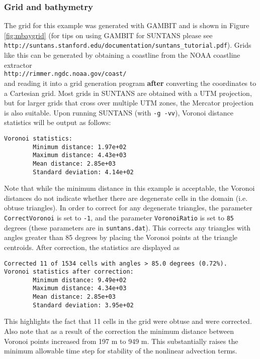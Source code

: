 \subsubsection{Grid and bathymetry}

The grid for this example was generated with GAMBIT and is shown in Figure \ref{fig:mbaygrid}
(for tips on using GAMBIT for SUNTANS please see\\
\verb+http://suntans.stanford.edu/documentation/suntans_tutorial.pdf+).
Grids like this can be generated by obtaining a coastline from the NOAA coastline extractor \\
\verb+http://rimmer.ngdc.noaa.gov/coast/+\\
and reading it into a grid generation program {\bf after} converting the coordinates to a Cartesian grid.
Most grids in SUNTANS are obtained with a UTM projection, but for larger grids that cross over multiple
UTM zones, the Mercator projection is also suitable.  
Upon running SUNTANS (with \verb+-g -vv+), Voronoi distance statistics will be output as follows:
\begin{verbatim}
Voronoi statistics:
        Minimum distance: 1.97e+02
        Maximum distance: 4.43e+03
        Mean distance: 2.85e+03
        Standard deviation: 4.14e+02
\end{verbatim}
Note that while the minimum distance in this example is acceptable, the Voronoi distances do
not indicate whether there are degenerate cells in the domain (i.e. obtuse triangles).  In order
to correct for any degenerate triangles, the parameter \verb+CorrectVoronoi+ is set to \verb+-1+,
and the parameter \verb+VoronoiRatio+ is set to \verb+85+ degrees (these parameters are in \verb+suntans.dat+).  
This corrects any triangles
with angles greater than 85 degrees by placing the Voronoi points at the triangle centroids.
After correction, the statistics are displayed as
\begin{verbatim}
Corrected 11 of 1534 cells with angles > 85.0 degrees (0.72%).
Voronoi statistics after correction:
        Minimum distance: 9.49e+02
        Maximum distance: 4.34e+03
        Mean distance: 2.85e+03
        Standard deviation: 3.95e+02
\end{verbatim}
This highlights the fact that 11 cells in the grid were obtuse and were corrected.  Also note that
as a result of the correction the minimum distance between Voronoi points increased from 197 m to
949 m.  This substantially raises the minimum allowable time step for stability of the nonlinear
advection terms.

